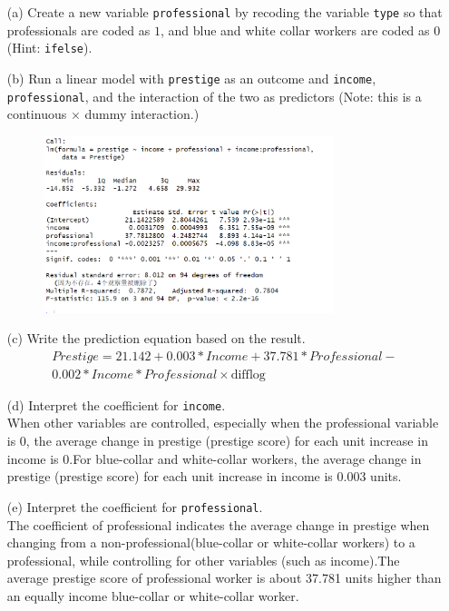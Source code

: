 \documentclass[12pt,letterpaper]{article}
\begin{document}
\newpage
\begin{enumerate}
	
	\item [(a)]
	Create a new variable \texttt{professional} by recoding the variable \texttt{type} so that professionals are coded as $1$, and blue and white collar workers are coded as $0$ (Hint: \texttt{ifelse}).
		
	\vspace{2cm}
	
	
	\item [(b)]
	Run a linear model with \texttt{prestige} as an outcome and \texttt{income}, \texttt{professional}, and the interaction of the two as predictors (Note: this is a continuous $\times$ dummy interaction.)
		
		\begin{figure}[h]
			\centering
			\includegraphics[width=0.8\textwidth]{Question1_data.png}
		\end{figure}	
	\vspace{6cm}
	\item [(c)]
	Write the prediction equation based on the result.
			\begin{align*}
			Prestige = 21.142 + 0.003*Income + 37.781*Professional -\\ 0.002*Income*Professional \times \text{difflog}
		\end{align*}
	\item [(d)]
	Interpret the coefficient for \texttt{income}.\\
	When other variables are controlled, especially when the professional variable is 0, the average change in prestige (prestige score) for each unit increase in income is 0.For blue-collar and white-collar workers, the average change in prestige (prestige score) for each unit increase in income is 0.003 units. 	
	\item [(e)]
	Interpret the coefficient for \texttt{professional}.\\
	The coefficient of professional indicates the average change in prestige when changing from a non-professional(blue-collar or white-collar workers) to a professional, while controlling for other variables (such as income).The average prestige score of professional worker is about 37.781 units higher than an equally income blue-collar or white-collar worker.


\end{enumerate}
\end{document}

